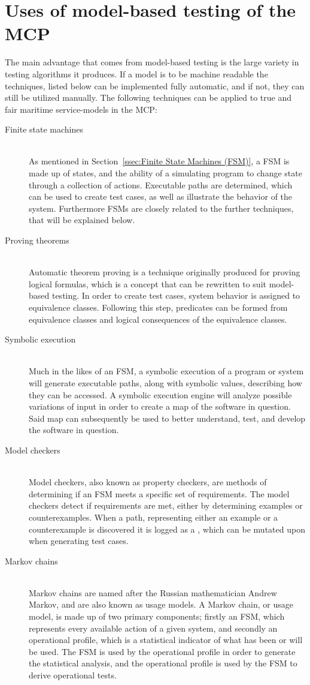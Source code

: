 \section{Uses of model-based testing of the MCP}
The main advantage that comes from model-based testing is the large variety in testing algorithms it produces. If a model is to be machine readable the techniques, listed below can be implemented fully automatic, and if not, they can still be utilized manually. The following techniques can be applied to true and fair maritime service-models in the MCP: \newpage
\begin{description}
	\item[Finite state machines]\ \\
		As mentioned in Section~\ref{ssec:Finite State Machines (FSM)}, a FSM is made up of states, and the ability of a simulating program to change state through a collection of actions. Executable paths are determined, which can be used to create test cases, as well as illustrate the behavior of the system. Furthermore FSMs are closely related to the further techniques, that will be explained below.
	\item[Proving theorems]\ \\
		Automatic theorem proving is a technique originally produced for proving logical formulas, which is a concept that can be rewritten to suit model-based testing. In order to create test cases, system behavior is assigned to equivalence classes. Following this step, predicates can be formed from equivalence classes and logical consequences of the equivalence classes. 
	\item[Symbolic execution]\ \\
		Much in the likes of an FSM, a symbolic execution of a program or system will generate executable paths, along with symbolic values, describing how they can be accessed. A symbolic execution engine will analyze possible variations of input in order to create a map of the software in question. Said map can subsequently be used to better understand, test, and develop the software in question.
	\item[Model checkers]\ \\
		Model checkers, also known as property checkers, are methods of determining if an FSM meets a specific set of requirements. The model checkers detect if requirements are met, either by determining examples or counterexamples. When a path, representing either an example or a counterexample is discovered it is logged as a , which can be mutated upon when generating test cases.
	\item[Markov chains]\ \\
		Markov chains are named after the Russian mathematician Andrew Markov, and are also known as usage models. A Markov chain, or usage model, is made up of two primary components; firstly an FSM, which represents every available action of a given system, and secondly an operational profile, which is a statistical indicator of what has been or will be used. The FSM is used by the operational profile in order to generate the statistical analysis, and the operational profile is used by the FSM to derive operational tests.
\end{description}
